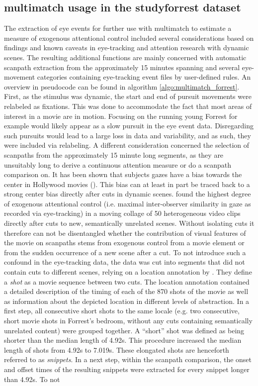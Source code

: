 \documentclass[a4paper, 12pt]{scrreprt}
\begin{document}
{\subsection{multimatch usage in the studyforrest dataset}
The extraction of eye events for further use with multimatch to estimate a measure of exogenous attentional control included several considerations based on findings and known caveats in eye-tracking and attention research with dynamic scenes. The resulting additional functions are mainly concerned with automatic scanpath extraction from the approximately 15 minutes spanning and several eye-movement categories containing eye-tracking event files by user-defined rules. An overview in pseudocode can be found in algorithm \ref{algo:multimatch_forrest}. \newline
First, as the stimulus was dynamic, the start and end of pursuit movements were relabeled as fixations. This was done to accommodate the fact that most areas of interest in a movie are in motion. Focusing on the running young Forrest for example would likely appear as a slow pursuit in the eye event data. Disregarding such pursuits would lead to a large loss in data and variability, and as such, they were included via relabeling. \newline A different consideration concerned the selection of scanpaths from the approximately 15 minute long segments, as they are unsuitably long to derive a continuous attention measure or do a scanpath comparison on. It has been shown that subjects gazes have a bias towards the center in Hollywood movies (\cite{tseng2009quantifying}). This bias can at least in part be traced back to a strong center bias directly after cuts in dynamic scenes. \textcite{carmi2006visual} found the highest degree of exogenous attentional control (i.e. maximal inter-observer similarity in gaze as recorded via eye-tracking) in a moving collage of 50 heterogeneous video clips directly after cuts to new, semantically unrelated scenes. Without isolating cuts it therefore can not be disentangled whether the contribution of visual features of the movie on scanpaths stems from exogenous control from a movie element or from the sudden occurrence of a new scene after a cut. To not introduce such a confound in the eye-tracking data, the data was cut into segments that did not contain cuts to different scenes, relying on a location annotation by \textcite{hausler2016annotation}. They define a \textit{shot} as a movie sequence between two cuts. The location annotation contained a detailed description of the timing of each of the 870 shots of the movie as well as information about the depicted location in different levels of abstraction. In a first step, all consecutive short shots to the same locale (e.g. two consecutive, short movie shots in Forrest's bedroom, without any cuts containing semantically unrelated content) were grouped together. A “short” shot was defined as being shorter than the median length of 4.92s. This procedure increased the median length of shots from 4.92s to 7.019s. These elongated shots are henceforth referred to as \textit{snippets}. In a next step, within the scanpath comparison, the onset and offset times of the resulting snippets were extracted for every snippet longer than 4.92s. To not }
\end{document}
